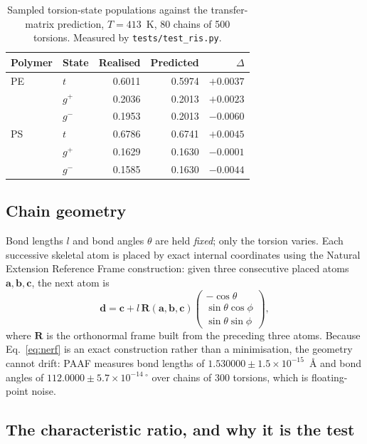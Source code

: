 \documentclass[11pt,a4paper]{article}
\begin{document}
\begin{table}[t]
\centering
\small
\begin{tabular}{llrrr}
\toprule
Polymer & State & Realised & Predicted & $\Delta$ \\
\midrule
PE & $t$      & 0.6011 & 0.5974 & $+0.0037$ \\
   & $g^{+}$  & 0.2036 & 0.2013 & $+0.0023$ \\
   & $g^{-}$  & 0.1953 & 0.2013 & $-0.0060$ \\
\midrule
PS & $t$      & 0.6786 & 0.6741 & $+0.0045$ \\
   & $g^{+}$  & 0.1629 & 0.1630 & $-0.0001$ \\
   & $g^{-}$  & 0.1585 & 0.1630 & $-0.0044$ \\
\bottomrule
\end{tabular}
\caption{Sampled torsion-state populations against the transfer-matrix
prediction, $T = 413$~K, 80 chains of 500 torsions. Measured by
\texttt{tests/test\_ris.py}.}
\label{tab:pops}
\end{table}

\subsection{Chain geometry}

Bond lengths $l$ and bond angles $\theta$ are held \emph{fixed}; only the
torsion varies. Each successive skeletal atom is placed by exact internal
coordinates using the Natural Extension Reference Frame construction: given
three consecutive placed atoms $\mathbf{a}, \mathbf{b}, \mathbf{c}$, the next
atom is
\begin{equation}
  \mathbf{d} = \mathbf{c} + l\,\mathbf{R}(\mathbf{a},\mathbf{b},\mathbf{c})
  \begin{pmatrix}
    -\cos\theta \\ \sin\theta\cos\phi \\ \sin\theta\sin\phi
  \end{pmatrix},
  \label{eq:nerf}
\end{equation}
where $\mathbf{R}$ is the orthonormal frame built from the preceding three
atoms. Because Eq.~\eqref{eq:nerf} is an exact construction rather than a
minimisation, the geometry cannot drift: PAAF measures bond lengths of
$1.530000 \pm 1.5\times10^{-15}$~\AA{} and bond angles of
$112.0000 \pm 5.7\times10^{-14}\,^\circ$ over chains of 300 torsions, which
is floating-point noise.

\subsection{The characteristic ratio, and why it is the test}
\end{document}
